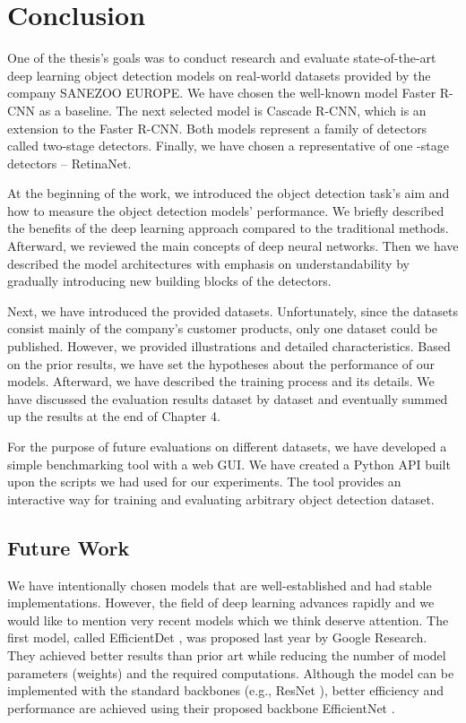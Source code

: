 \chapter{Conclusion}

One of the thesis's goals was to conduct research and evaluate state-of-the-art
deep learning object detection models on real-world datasets provided by the
company SANEZOO EUROPE. We have chosen the well-known model Faster R-CNN as a
baseline. The next selected model is Cascade R-CNN, which is an extension to the
Faster R-CNN. Both models represent a family of detectors called two-stage
detectors. Finally, we have chosen a representative of one -stage detectors --
RetinaNet.

At the beginning of the work, we introduced the object detection task's aim and
how to measure the object detection models' performance. We briefly described
the benefits of the deep learning approach compared to the traditional methods.
Afterward, we reviewed the main concepts of deep neural networks. Then we have
described the model architectures with emphasis on understandability by
gradually introducing new building blocks of the detectors.

Next, we have introduced the provided datasets. Unfortunately, since the
datasets consist mainly of the company's customer products, only one dataset
could be published. However, we provided illustrations and detailed
characteristics. Based on the prior results, we have set the hypotheses about
the performance of our models. Afterward, we have described the training
process and its details. We have discussed the evaluation results dataset by
dataset and eventually summed up the results at the end of Chapter 4.

For the purpose of future evaluations on different datasets, we have developed
a simple benchmarking tool with a web GUI. We have created a Python API built
upon the scripts we had used for our experiments. The tool provides an
interactive way for training and evaluating arbitrary object detection dataset.

\section{Future Work}
We have intentionally chosen models that are well-established and had stable
implementations. However, the field of deep learning advances rapidly and we
would like to mention very recent models which we think deserve attention. The
first model, called EfficientDet \cite{efficientdet}, was proposed last year by
Google Research. They achieved better results than prior art while reducing the
number of model parameters (weights) and the required computations. Although the
model can be implemented with the standard backbones (e.g., ResNet
\cite{resnet}), better efficiency and performance are achieved using their
proposed backbone EfficientNet \cite{efficientnet}.

